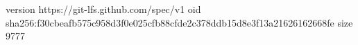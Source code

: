 version https://git-lfs.github.com/spec/v1
oid sha256:f30cbeafb575c958d3f0e025cfb88cfde2c378ddb15d8e3f13a21626162668fe
size 9777
